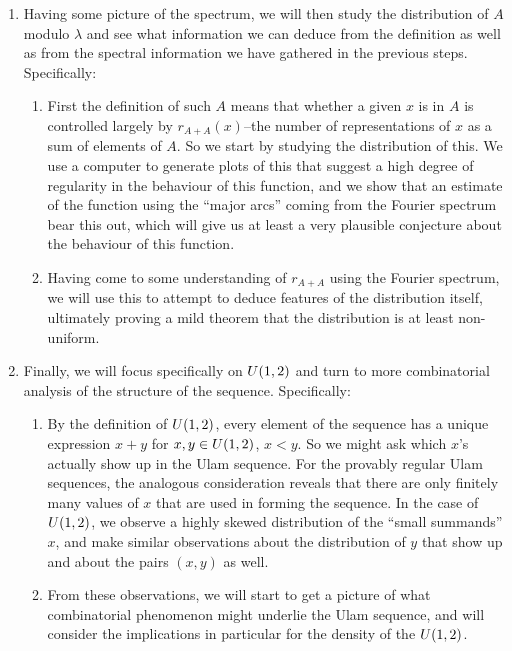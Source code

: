\documentclass{report}
\theoremstyle{remark}
\numberwithin{equation}{section}
\begin{document}
\begin{enumerate}
\item Having some picture of the spectrum, we will then study the
  distribution of $A$ modulo $\lambda$ and see what information we can
  deduce from the definition as well as from the spectral information
  we have gathered in the previous steps.  Specifically:
  \begin{enumerate}
  \item First the definition of such $A$ means that whether a given
    $x$ is in $A$ is controlled largely by $r_{A+A}(x)$--the number of
    representations of $x$ as a sum of elements of $A$.  So we start
    by studying the distribution of this.  We use a computer to
    generate plots of this that suggest a high degree of regularity in
    the behaviour of this function, and we show that an estimate of
    the function using the ``major arcs'' coming from the Fourier
    spectrum bear this out, which will give us at least a very
    plausible conjecture about the behaviour of this function.
  \item Having come to some understanding of $r_{A+A}$ using the
    Fourier spectrum, we will use this to attempt to deduce features
    of the distribution itself, ultimately proving a mild theorem that
    the distribution is at least non-uniform.
  \end{enumerate}

\item Finally, we will focus specifically on $U(1,2)$ and turn to
  more combinatorial analysis of the structure of the sequence.
  Specifically: 
  \begin{enumerate}
  \item By the definition of $U(1,2)$, every element of the
    sequence has a unique expression $x+y$ for $x, y \in U(1,2)$,
    $x < y$.  So we might ask which $x$'s actually show up in the Ulam
    sequence.  For the provably regular Ulam sequences, the analogous
    consideration reveals that there are only finitely many values of
    $x$ that are used in forming the sequence.  In the case of
    $U(1,2)$, we observe a highly skewed distribution of the
    ``small summands'' $x$, and make similar observations about the
    distribution of $y$ that show up and about the pairs $(x, y)$ as
    well.
  \item From these observations, we will start to get a picture of
    what combinatorial phenomenon might underlie the Ulam sequence, and
    will consider the implications in particular for the density of
    the $U(1,2)$.
  \end{enumerate}
\end{enumerate}
\end{document}
